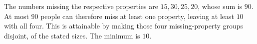 The numbers missing the respective properties are $15,30,25,20$, whose sum is $90$. At most $90$ people can therefore miss at least one property, leaving at least $10$ with all four. This is attainable by making those four missing-property groups disjoint, of the stated sizes. The minimum is $\boxed{10}$.
